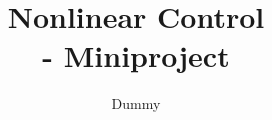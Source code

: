 


\title{\vspace{-2cm} Nonlinear Control \\ \Large - Miniproject}
\author{Dummy}


\maketitle





